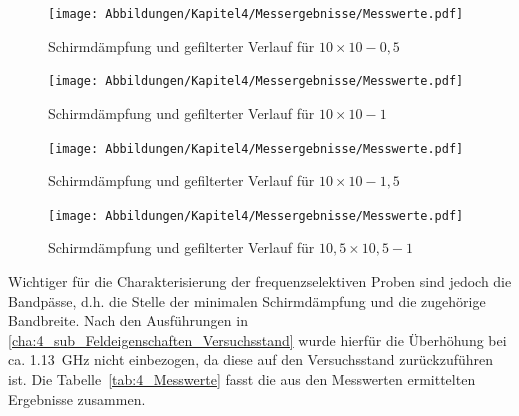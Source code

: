 \begin{figure}[H]
    \centering
    \texttt{[image: Abbildungen/Kapitel4/Messergebnisse/Messwerte.pdf]}
    \caption{Schirmdämpfung und gefilterter Verlauf für $10\times10-0,5$}
    \label{fig:4_Schirmdämpfung_10x10-0k5}
\end{figure}

\begin{figure}[H]
    \centering
    \texttt{[image: Abbildungen/Kapitel4/Messergebnisse/Messwerte.pdf]}
    \caption{Schirmdämpfung und gefilterter Verlauf für $10\times10-1$}
    \label{fig:4_Schirmdämpfung_10x10-1}
\end{figure}

\begin{figure}[H]
    \centering
    \texttt{[image: Abbildungen/Kapitel4/Messergebnisse/Messwerte.pdf]}
    \caption{Schirmdämpfung und gefilterter Verlauf für $10\times10-1,5$}
    \label{fig:4_Schirmdämpfung_10x10-1k5}
\end{figure}

\begin{figure}[H]
    \centering
    \texttt{[image: Abbildungen/Kapitel4/Messergebnisse/Messwerte.pdf]}
    \caption{Schirmdämpfung und gefilterter Verlauf für $10,5\times10,5-1$}
    \label{fig:4_Schirmdämpfung_10k5x10k5-1}
\end{figure}

\newpage

Wichtiger für die Charakterisierung der frequenzselektiven Proben sind jedoch die Bandpässe, d.h. die Stelle der minimalen Schirmdämpfung und die zugehörige Bandbreite. Nach den Ausführungen in \Abschnitt\ref{cha:4_sub_Feldeigenschaften_Versuchsstand} wurde hierfür die Überhöhung bei ca. \SI{1.13}{\giga\hertz} nicht einbezogen, da diese auf den Versuchsstand zurückzuführen ist. Die Tabelle~\ref{tab:4_Messwerte} fasst die aus den Messwerten ermittelten Ergebnisse zusammen. 
\par
\vspace{\linespace}

